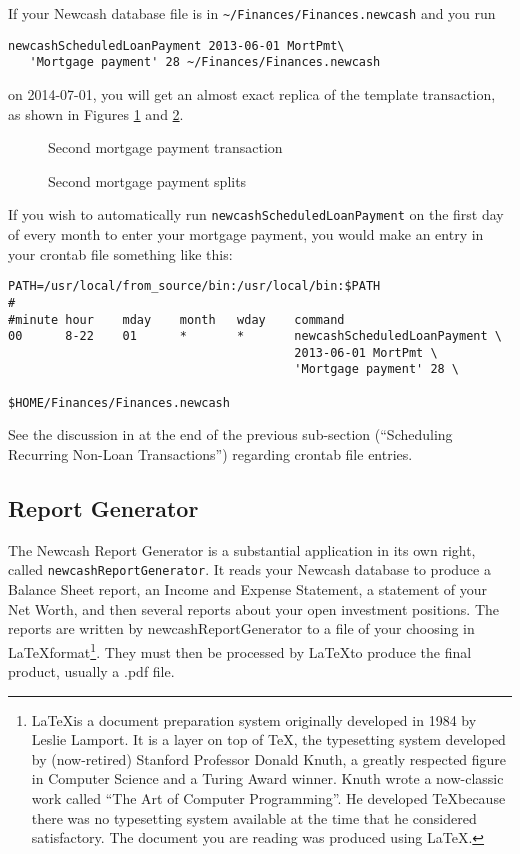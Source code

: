 \documentclass{report}
\newcommand{\graphicsfig}[5]{
\begin{figure}[#5]
\begin{center}
\resizebox{#1}{!}{\texttt{[image: \#2]}}
\end{center}
\caption{#3}
\label{#4}
\end{figure}
}
\begin{document}
If  your Newcash database file is in \verb|~/Finances/Finances.newcash|  and you run
\begin{verbatim}
newcashScheduledLoanPayment 2013-06-01 MortPmt\
   'Mortgage payment' 28 ~/Finances/Finances.newcash
\end{verbatim}
on 2014-07-01, you will get an almost exact replica of the template transaction, as shown in Figures \ref{Second mortgage payment transaction} and \ref{Second mortgage payment splits}. 
\graphicsfig{5in}{figures/second_mortgage_payment_transaction.png}{Second mortgage payment transaction}{Second mortgage payment transaction}{}
\graphicsfig{5in}{figures/second_mortgage_payment_splits.png}{Second mortgage payment splits}{Second mortgage payment splits}{}

If you wish to automatically run \verb|newcashScheduledLoanPayment| on the first day of every month to enter your mortgage payment, you would make an entry in your crontab file something like this:

\begin{verbatim}
PATH=/usr/local/from_source/bin:/usr/local/bin:$PATH
#
#minute	hour	mday	month	wday	command
00      8-22    01      *       *       newcashScheduledLoanPayment \
                                        2013-06-01 MortPmt \
                                        'Mortgage payment' 28 \
                                        $HOME/Finances/Finances.newcash
\end{verbatim}

See the discussion in at the end of the previous sub-section (``Scheduling Recurring Non-Loan Transactions'') regarding crontab file entries.

\subsection{Report Generator}
\label{Newcash Report Generator}
The Newcash Report Generator is a substantial application in its own right, called \verb|newcashReportGenerator|. It reads your Newcash database to produce a Balance Sheet report, an Income and Expense Statement, a statement of your Net Worth, and then several reports about your open investment positions. The reports are written by newcashReportGenerator to a file of your choosing in \LaTeX format\footnote{\LaTeX is a document preparation system originally developed in 1984 by Leslie Lamport. It is a layer on top of \TeX, the typesetting system developed by (now-retired) Stanford Professor Donald Knuth, a greatly respected figure in Computer Science and a Turing Award winner. Knuth wrote a now-classic work called ``The Art of Computer Programming''. He developed \TeX because there was no typesetting system available at the time that he considered satisfactory. The document you are reading was produced using \LaTeX.}. They must then be processed by \LaTeX to produce the final product, usually a .pdf file.
\end{document}
